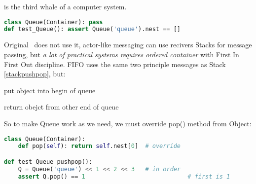 \clearpage{}

 is the third whale of a computer system.

\begin{lstlisting}[language=Python]
class Queue(Container): pass
def test_Queue(): assert Queue('queue').nest == []
\end{lstlisting}

\noindent
Original \F\ does not use it, actor-like messaging can use recivers Stacks for
message passing, but
\emph{a lot of practical systems requires ordered container} with First In First Out
discipline. FIFO uses the same two principle messages as Stack
\ref{stackpushpop}, but:
\begin{description}[nosep]
\item[push] put object into begin of queue
\item[pop] return obejct from other end of queue
\end{description}

\clearpage
So to make Queue work as we need, we must override pop() method from Object:
\begin{lstlisting}[language=Python]
class Queue(Container):
	def pop(self): return self.nest[0]	# override

def test_Queue_pushpop():
	Q = Queue('queue') << 1 << 2 << 3	# in order
	assert Q.pop() == 1								# first is 1
\end{lstlisting}
    